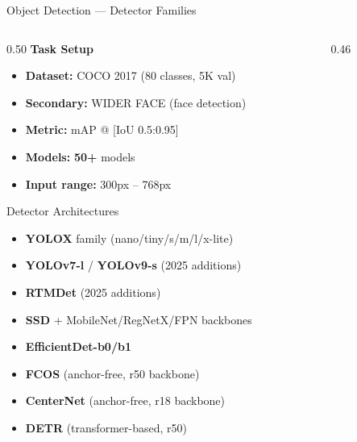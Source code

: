 \documentclass[aspectratio=169,12pt]{beamer}
\newcommand{\highlight}[1]{\textcolor{TIRed}{\textbf{#1}}}
\begin{document}
\begin{frame}{Object Detection --- Detector Families}
  \begin{columns}[T]
    \begin{column}{0.50\textwidth}
      \textbf{Task Setup}
      \begin{itemize}\footnotesize
        \item \textbf{Dataset:} COCO 2017 (80 classes, 5K val)
        \item \textbf{Secondary:} WIDER FACE (face detection)
        \item \textbf{Metric:} mAP @ [IoU 0.5:0.95]
        \item \textbf{Models:} \highlight{50+} models
        \item \textbf{Input range:} 300px – 768px
      \end{itemize}

      \vspace{0.3cm}
      \begin{block}{Detector Architectures}
        \begin{itemize}\scriptsize
          \item \textbf{YOLOX} family (nano/tiny/s/m/l/x-lite)
          \item \textbf{YOLOv7-l} / \textbf{YOLOv9-s} (2025 additions)
          \item \textbf{RTMDet} (2025 additions)
          \item \textbf{SSD} + MobileNet/RegNetX/FPN backbones
          \item \textbf{EfficientDet-b0/b1}
          \item \textbf{FCOS} (anchor-free, r50 backbone)
          \item \textbf{CenterNet} (anchor-free, r18 backbone)
          \item \textbf{DETR} (transformer-based, r50)
        \end{itemize}
      \end{block}
    \end{column}

    \begin{column}{0.46\textwidth}
\end{column}
\end{columns}
\end{frame}
\end{document}
